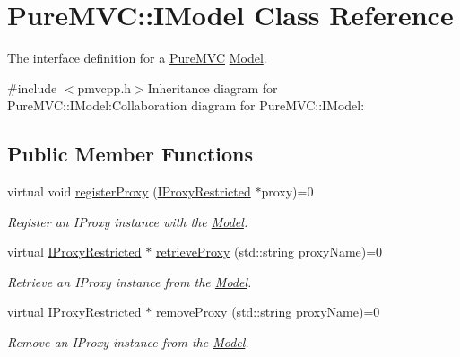 \hypertarget{class_pure_m_v_c_1_1_i_model}{
\section{PureMVC::IModel Class Reference}
\label{class_pure_m_v_c_1_1_i_model}
}


The interface definition for a \hyperlink{namespace_pure_m_v_c}{PureMVC} \hyperlink{class_pure_m_v_c_1_1_model}{Model}.  


{\ttfamily \#include $<$pmvcpp.h$>$}Inheritance diagram for PureMVC::IModel:Collaboration diagram for PureMVC::IModel:\subsection*{Public Member Functions}
\begin{DoxyCompactItemize}
\item 
virtual void \hyperlink{class_pure_m_v_c_1_1_i_model_a538f7de97ba62dcce4d0144e88055d0b}{registerProxy} (\hyperlink{class_pure_m_v_c_1_1_i_proxy_restricted}{IProxyRestricted} $\ast$proxy)=0
\begin{DoxyCompactList}\small\item\em Register an {\ttfamily IProxy} instance with the {\ttfamily \hyperlink{class_pure_m_v_c_1_1_model}{Model}}. \item\end{DoxyCompactList}\item 
virtual \hyperlink{class_pure_m_v_c_1_1_i_proxy_restricted}{IProxyRestricted} $\ast$ \hyperlink{class_pure_m_v_c_1_1_i_model_a646757239d2d3e4f711f3738a68bfb06}{retrieveProxy} (std::string proxyName)=0
\begin{DoxyCompactList}\small\item\em Retrieve an {\ttfamily IProxy} instance from the \hyperlink{class_pure_m_v_c_1_1_model}{Model}. \item\end{DoxyCompactList}\item 
virtual \hyperlink{class_pure_m_v_c_1_1_i_proxy_restricted}{IProxyRestricted} $\ast$ \hyperlink{class_pure_m_v_c_1_1_i_model_a40caa7c04f887dda157125d94267fff9}{removeProxy} (std::string proxyName)=0
\begin{DoxyCompactList}\small\item\em Remove an {\ttfamily IProxy} instance from the \hyperlink{class_pure_m_v_c_1_1_model}{Model}. \item\end{DoxyCompactList}\item 

\end{DoxyCompactItemize}

